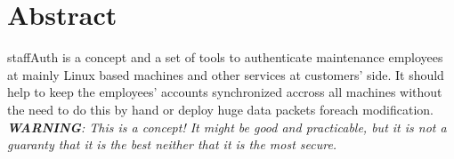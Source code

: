 %
%
%
%
%
%
%


\section*{Abstract}

staffAuth is a concept and a set of tools to authenticate maintenance employees
at mainly Linux based machines and other services at customers' side. It should
help to keep the employees' accounts synchronized accross all machines without
the need to do this by hand or deploy huge data packets foreach modification. \\

\textit{\textbf{WARNING}: This is a concept! It might be good and practicable,
but it is not a guaranty that it is the best neither that it is the most
secure.}
